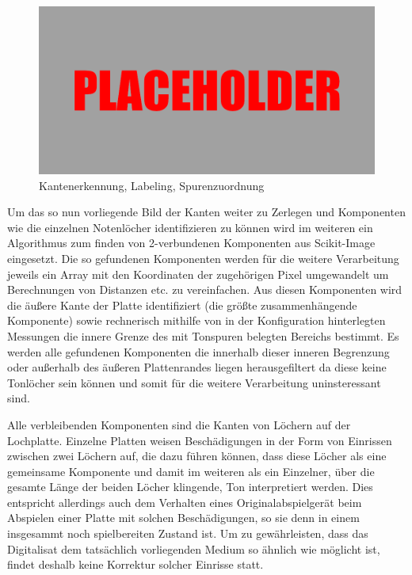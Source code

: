\begin{figure}[t]
    \centering
    \includegraphics[width=\textwidth]{graphics/placeholder.png}
    \caption{Kantenerkennung, Labeling, Spurenzuordnung}
    \label{pipelinesteps}
\end{figure}

Um das so nun vorliegende Bild der Kanten weiter zu Zerlegen und Komponenten wie die einzelnen Notenlöcher identifizieren zu können wird im weiteren ein Algorithmus zum finden von 2-verbundenen Komponenten aus Scikit-Image \parencite[]{scikit-image} eingesetzt.
Die so gefundenen Komponenten werden für die weitere Verarbeitung jeweils ein Array mit den Koordinaten der zugehörigen Pixel umgewandelt um Berechnungen von Distanzen etc. zu vereinfachen.
Aus diesen Komponenten wird die äußere Kante der Platte identifiziert (die größte zusammenhängende Komponente) sowie rechnerisch mithilfe von in der Konfiguration hinterlegten Messungen die innere Grenze des mit Tonspuren belegten Bereichs bestimmt.
Es werden alle gefundenen Komponenten die innerhalb dieser inneren Begrenzung oder außerhalb des äußeren Plattenrandes liegen herausgefiltert da diese keine Tonlöcher sein können und somit für die weitere Verarbeitung uninsteressant sind.

Alle verbleibenden Komponenten sind die Kanten von Löchern auf der Lochplatte.
Einzelne Platten weisen Beschädigungen in der Form von Einrissen zwischen zwei Löchern auf, die dazu führen können, dass diese Löcher als eine gemeinsame Komponente und damit im weiteren als ein Einzelner, über die gesamte Länge der beiden Löcher klingende, Ton interpretiert werden.
Dies entspricht allerdings auch dem Verhalten eines Originalabspielgerät beim Abspielen einer Platte mit solchen Beschädigungen, so sie denn in einem insgesammt noch spielbereiten Zustand ist.
Um zu gewährleisten, dass das Digitalisat dem tatsächlich vorliegenden Medium so ähnlich wie möglicht ist, findet deshalb keine Korrektur solcher Einrisse statt.

